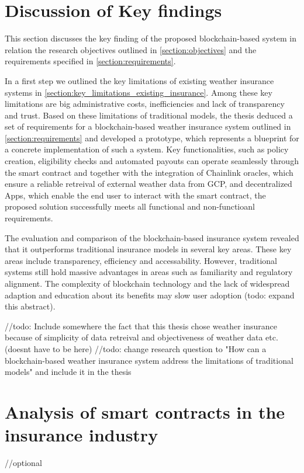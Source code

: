 \section{Discussion of Key findings}
This section discusses the key finding of the proposed blockchain-based system in relation the research objectives outlined in \cref{section:objectives} and the requirements specified in \cref{section:requirements}. 

In a first step we outlined the key limitations of existing weather insurance systems in \cref{section:key_limitations_existing_insurance}. Among these key limitations are big administrative costs, inefficiencies and lack of transparency and trust. Based on these limitations of traditional models, the thesis deduced a set of requirements for a blockchain-based weather insurance system outlined in \cref{section:requirements} and developed a prototype, which represents a blueprint for a concrete implementation of such a system. Key functionalities, such as policy creation, eligibility checks and automated payouts can operate seamlessly through the smart contract and together with the integration of Chainlink oracles, which ensure a reliable retreival of external weather data from GCP, and decentralized Apps, which enable the end user to interact with the smart contract, the proposed solution successfully meets all functional and non-functioanl requirements.

The evaluation and comparison of the blockchain-based insurance system revealed that it outperforms traditional insurance models in several key areas. These key areas include transparency, efficiency and accessability. However, traditional systems still hold massive advantages in areas such as familiarity and regulatory alignment. The complexity of blockchain technology and the lack of widespread adaption and education about its benefits may slow user adoption (todo: expand this abstract).

//todo: Include somewhere the fact that this thesis chose weather insurance because of simplicity of data retreival and objectiveness of weather data etc. (doesnt have to be here)
//todo: change research question to "How can a blockchain-based weather insurance system address the limitations of traditional models" and include it in the thesis

\section{Analysis of smart contracts in the insurance industry}\label{section:analysis_smart_contracts_insurance}
//optional

